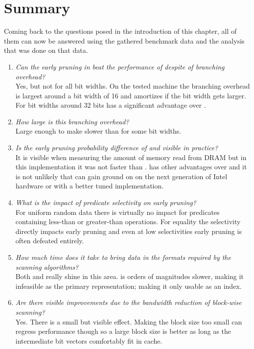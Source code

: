 \newpage
\section{Summary}

Coming back to the questions posed in the introduction of this chapter, all of
them can now be answered using the gathered benchmark data and the analysis that
was done on that data.

\begin{enumerate}
  \item \emph{Can the early pruning in \bwv{} beat the performance of
    \simdscan{} despite of branching overhead?}\\
    Yes, but not for all bit widths.  On the tested machine the branching
    overhead is largest around a bit width of 16 and amortizes if the bit width
    gets larger. For bit widths around 32 bits \bwv{} has a significant advantage
    over \simdscan{}.
  \item \emph{How large is this branching overhead?}\\
    Large enough to make \bwv{} slower than \simdscan{} for some bit widths.
  \item \emph{Is the early pruning probability difference of \bwv{} and \bs{}
    visible in practice?}\\
    It is visible when measuring the amount of memory read from DRAM but in this
    implementation it was not faster than \bwv{}. \bs{} has other advantages
    over \bwv{} and it is not unlikely that \bs{} can gain ground on \bwv{} on
    the next generation of Intel hardware or with a better tuned implementation.
  \item \emph{What is the impact of predicate selectivity on early pruning?}\\
    For uniform random data there is virtually no impact for predicates
    containing less-than or greater-than operations. For equality the
    selectivity directly impacts early pruning and even at low selectivities
    early pruning is often defeated entirely.
  \item \emph{How much time does it take to bring data in the formats required
    by the scanning algorithms?}\\
    Both \simdscan{} and \bs{} really shine in this area. \bwv{} is orders of
    magnitudes slower, making it infeasible as the primary representation;
    making it only usable as an index.
  \item \emph{Are there visible improvements due to the bandwidth reduction of
    block-wise scanning?}\\
    Yes. There is a small but visible effect. Making the block size too small
    can regress performance though so a large block size is better as long as
    the intermediate bit vectors comfortably fit in cache.
\end{enumerate}
